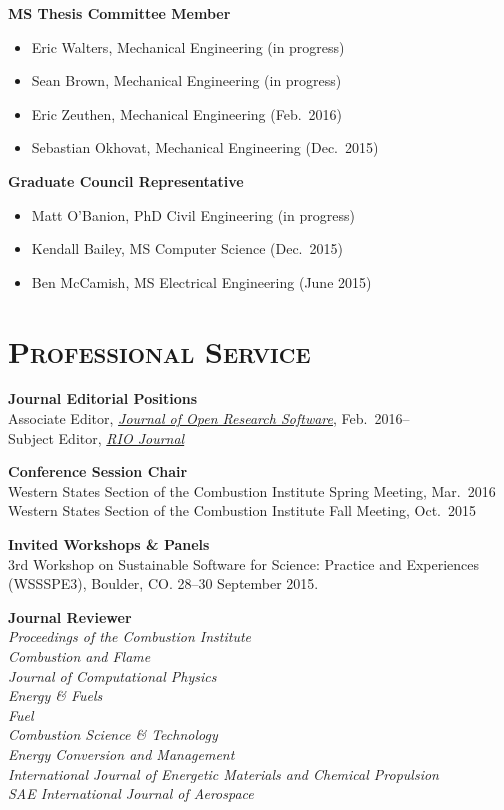 \documentclass[margin,line,11pt]{res}
\begin{document}
\begin{resume}

\textbf{MS Thesis Committee Member}
\begin{itemize}[leftmargin=*]
\item Eric Walters, Mechanical Engineering (in progress)
\item Sean Brown, Mechanical Engineering (in progress)
\item Eric Zeuthen, Mechanical Engineering (Feb.\ 2016)
\item Sebastian Okhovat, Mechanical Engineering (Dec.\ 2015)
\end{itemize}

\textbf{Graduate Council Representative}
\begin{itemize}[leftmargin=*]
\item Matt O'Banion, PhD Civil Engineering (in progress)
\item Kendall Bailey, MS Computer Science (Dec.\ 2015)
\item Ben McCamish, MS Electrical Engineering (June 2015)
\end{itemize}

\section{\textsc{Professional Service}}

\textbf{Journal Editorial Positions} \\
Associate Editor, \href{http://openresearchsoftware.metajnl.com}{\emph{Journal of Open Research Software}}, Feb.\ 2016-- \\
Subject Editor, \href{http://riojournal.com}{\emph{RIO Journal}}

\textbf{Conference Session Chair} \\
Western States Section of the Combustion Institute Spring Meeting, Mar.\ 2016 \\
Western States Section of the Combustion Institute Fall Meeting, Oct.\ 2015

\textbf{Invited Workshops \& Panels} \\
3rd Workshop on Sustainable Software for Science: Practice and Experiences (WSSSPE3), Boulder, CO. 28--30 September 2015.

\textbf{Journal Reviewer} \\
\emph{Proceedings of the Combustion Institute}\\
\emph{Combustion and Flame}\\
\emph{Journal of Computational Physics}\\
\emph{Energy \& Fuels}\\
\emph{Fuel}\\
\emph{Combustion Science \& Technology}\\
\emph{Energy Conversion and Management}\\
\emph{International Journal of Energetic Materials and Chemical Propulsion}\\
\emph{SAE International Journal of Aerospace}


\end{resume}
\end{document}
